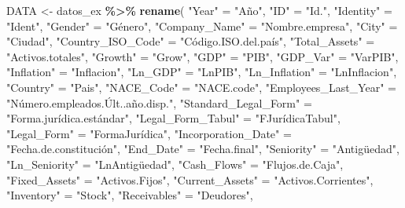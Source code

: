 \documentclass[
]{article}
\newenvironment{Shaded}{\begin{snugshade}}{\end{snugshade}}
\newcommand{\FunctionTok}[1]{\textcolor[rgb]{0.13,0.29,0.53}{\textbf{#1}}}
\newcommand{\NormalTok}[1]{#1}
\newcommand{\OtherTok}[1]{\textcolor[rgb]{0.56,0.35,0.01}{#1}}
\newcommand{\SpecialCharTok}[1]{\textcolor[rgb]{0.81,0.36,0.00}{\textbf{#1}}}
\newcommand{\StringTok}[1]{\textcolor[rgb]{0.31,0.60,0.02}{#1}}
\begin{document}
\begin{Shaded}
\begin{Highlighting}[]
\NormalTok{DATA }\OtherTok{\textless{}{-}}\NormalTok{ datos\_ex }\SpecialCharTok{\%\textgreater{}\%}
  \FunctionTok{rename}\NormalTok{(}
    \StringTok{"Year"} \OtherTok{=} \StringTok{"Año"}\NormalTok{,}
    \StringTok{"ID"} \OtherTok{=} \StringTok{"Id."}\NormalTok{,}
    \StringTok{"Identity"} \OtherTok{=} \StringTok{"Ident"}\NormalTok{,}
    \StringTok{"Gender"} \OtherTok{=} \StringTok{"Género"}\NormalTok{,}
    \StringTok{"Company\_Name"} \OtherTok{=} \StringTok{"Nombre.empresa"}\NormalTok{,}
    \StringTok{"City"} \OtherTok{=} \StringTok{"Ciudad"}\NormalTok{,}
    \StringTok{"Country\_ISO\_Code"} \OtherTok{=} \StringTok{"Código.ISO.del.país"}\NormalTok{,}
    \StringTok{"Total\_Assets"} \OtherTok{=} \StringTok{"Activos.totales"}\NormalTok{,}
    \StringTok{"Growth"} \OtherTok{=} \StringTok{"Grow"}\NormalTok{,}
    \StringTok{"GDP"} \OtherTok{=} \StringTok{"PIB"}\NormalTok{,}
    \StringTok{"GDP\_Var"} \OtherTok{=} \StringTok{"VarPIB"}\NormalTok{,}
    \StringTok{"Inflation"} \OtherTok{=} \StringTok{"Inflacion"}\NormalTok{,}
    \StringTok{"Ln\_GDP"} \OtherTok{=} \StringTok{"LnPIB"}\NormalTok{,}
    \StringTok{"Ln\_Inflation"} \OtherTok{=} \StringTok{"LnInflacion"}\NormalTok{,}
    \StringTok{"Country"} \OtherTok{=} \StringTok{"Pais"}\NormalTok{,}
    \StringTok{"NACE\_Code"} \OtherTok{=} \StringTok{"NACE.code"}\NormalTok{,}
    \StringTok{"Employees\_Last\_Year"} \OtherTok{=} \StringTok{"Número.empleados.Últ..año.disp."}\NormalTok{,}
    \StringTok{"Standard\_Legal\_Form"} \OtherTok{=} \StringTok{"Forma.jurídica.estándar"}\NormalTok{,}
    \StringTok{"Legal\_Form\_Tabul"} \OtherTok{=} \StringTok{"FJurídicaTabul"}\NormalTok{,}
    \StringTok{"Legal\_Form"} \OtherTok{=} \StringTok{"FormaJurídica"}\NormalTok{,}
    \StringTok{"Incorporation\_Date"} \OtherTok{=} \StringTok{"Fecha.de.constitución"}\NormalTok{,}
    \StringTok{"End\_Date"} \OtherTok{=} \StringTok{"Fecha.final"}\NormalTok{,}
    \StringTok{"Seniority"} \OtherTok{=} \StringTok{"Antigüedad"}\NormalTok{,}
    \StringTok{"Ln\_Seniority"} \OtherTok{=} \StringTok{"LnAntigüedad"}\NormalTok{,}
    \StringTok{"Cash\_Flows"} \OtherTok{=} \StringTok{"Flujos.de.Caja"}\NormalTok{,}
    \StringTok{"Fixed\_Assets"} \OtherTok{=} \StringTok{"Activos.Fijos"}\NormalTok{,}
    \StringTok{"Current\_Assets"} \OtherTok{=} \StringTok{"Activos.Corrientes"}\NormalTok{,}
    \StringTok{"Inventory"} \OtherTok{=} \StringTok{"Stock"}\NormalTok{,}
    \StringTok{"Receivables"} \OtherTok{=} \StringTok{"Deudores"}\NormalTok{,}

\end{Highlighting}
\end{Shaded}
\end{document}
